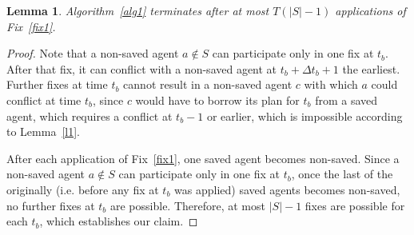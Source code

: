 \documentclass[a4paper,12pt]{article}
\newtheorem{lemma}{Lemma}
\newcommand{\Le}[1]{\begin{lemma}{\em #1}\end{lemma}}
\begin{document}
\Le{Algorithm~\ref{alg1} terminates after at most $T(|S|-1)$ applications of Fix~\ref{fix1}.}
\begin{proof}
Note that a non-saved agent $a\notin S$ can participate only in one fix at $t_b$. After that fix, it can conflict with a non-saved agent at $t_b+\Delta t_b + 1$ the earliest. Further fixes at time $t_b$ cannot result in a non-saved agent $c$ with which $a$ could conflict at time $t_b$, since $c$ would have to borrow its plan for $t_b$ from a saved agent, which requires a conflict at $t_b-1$ or earlier, which is impossible according to Lemma~\ref{l1}.


After each application of Fix~\ref{fix1}, one saved agent becomes non-saved. Since a non-saved agent $a\notin S$ can participate only in one fix at $t_b$, once the last of the originally (i.e. before any fix at $t_b$ was applied) saved agents becomes non-saved, no further fixes at $t_b$ are possible. Therefore, at most $|S|-1$ fixes are possible for each $t_b$, which establishes our claim.  
\end{proof}
\end{document}
